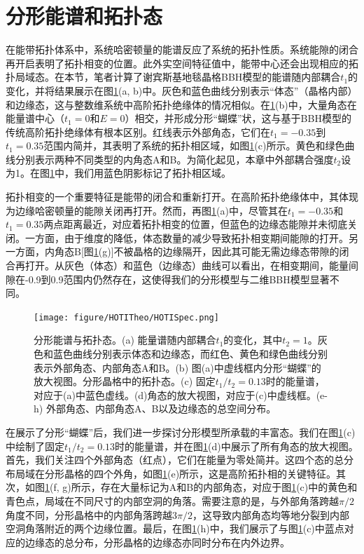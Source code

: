\section{分形能谱和拓扑态}
在能带拓扑体系中，系统哈密顿量的能谱反应了系统的拓扑性质。系统能隙的闭合再开启表明了拓扑相变的位置。此外实空间特征值中，能带中心还会出现相应的拓扑局域态。在本节，笔者计算了谢宾斯基地毯晶格BBH模型的能谱随内部耦合$t_1$的变化，并将结果展示在图\ref{fig:HOTISpec}(a, b)中。灰色和蓝色曲线分别表示“体态”（晶格内部）和边缘态，这与整数维系统中高阶拓扑绝缘体的情况相似。在\ref{fig:HOTISpec}(b)中，大量角态在能量谱中心（$t_1=0$和$E=0$）相交，并形成分形“蝴蝶”状，这与基于BBH模型的传统高阶拓扑绝缘体有根本区别。红线表示外部角态，它们在$t_1=-0.35$到$t_1=0.35$范围内简并，其表明了系统的拓扑相区域，如图\ref{fig:HOTISpec}(c)所示。黄色和绿色曲线分别表示两种不同类型的内角态A和B。为简化起见，本章中外部耦合强度$t_2$设为1。在图\ref{fig:HOTISpec}中，我们用蓝色阴影标记了拓扑相区域。

拓扑相变的一个重要特征是能带的闭合和重新打开。在高阶拓扑绝缘体中，其体现为边缘哈密顿量的能隙关闭再打开。然而，再图\ref{fig:HOTISpec}(a)中，尽管其在$t_1=-0.35$和$t_1=0.35$两点距离最近，对应着拓扑相变的位置，但蓝色的边缘态能隙并未彻底关闭。一方面，由于维度的降低，体态数量的减少导致拓扑相变期间能隙的打开。另一方面，内角态B[图\ref{fig:HOTISpec}(g)]不被晶格的边缘隔开，因此其可能无需边缘态带隙的闭合再打开。从灰色（体态）和蓝色（边缘态）曲线可以看出，在相变期间，能量间隙在-0.9到0.9范围内仍然存在，这使得我们的分形模型与二维BBH模型显著不同。

\begin{figure}[htbp]
    \centering
    \texttt{[image: figure/HOTITheo/HOTISpec.png]}
    \caption{分形能谱与拓扑态。(a) 能量谱随内部耦合$t_1$的变化，其中$t_2=1$。灰色和蓝色曲线分别表示体态和边缘态，而红色、黄色和绿色曲线分别表示外部角态、内部角态A和B。(b) 图(a)中虚线框内分形“蝴蝶”的放大视图。分形晶格中的拓扑态。(c) 固定$t_1/t_2=0.13$时的能量谱，对应于(a)中蓝色虚线。(d)角态的放大视图，对应于(c)中虚线框。(e-h) 外部角态、内部角态A、B以及边缘态的总空间分布。}
    \label{fig:HOTISpec}
\end{figure}

在展示了分形“蝴蝶”后，我们进一步探讨分形模型所承载的丰富态。我们在图\ref{fig:HOTISpec}(c)中绘制了固定$t_1/t_2=0.13$时的能量谱，并在图\ref{fig:HOTISpec}(d)中展示了所有角态的放大视图。首先，我们关注四个外部角态（红点），它们在能量为零处简并。这四个态的总分布局域在分形晶格的四个外角，如图\ref{fig:HOTISpec}(e)所示，这是高阶拓扑相的关键特征。其次，如图\ref{fig:HOTISpec}(f, g)所示，存在大量标记为A和B的内部角态，对应于图\ref{fig:HOTISpec}(c)中的黄色和青色点，局域在不同尺寸的内部空洞的角落。需要注意的是，与外部角落跨越$\pi/2$角度不同，分形晶格中的内部角落跨越$3\pi/2$，这导致内部角态均等地分裂到内部空洞角落附近的两个边缘位置。最后，在图\ref{fig:HOTISpec}(h)中，我们展示了与图\ref{fig:HOTISpec}(c)中蓝点对应的边缘态的总分布，分形晶格的边缘态亦同时分布在内外边界。

